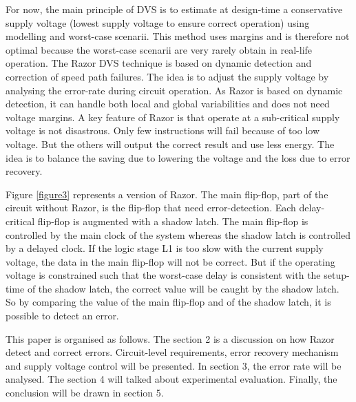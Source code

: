 \documentclass[fleqn,envcountsame,runningheads,10pt,a4paper]{llncs}
\begin{document}
For now, the main principle of DVS is to estimate at design-time a conservative supply voltage (lowest supply voltage to ensure correct operation) using modelling and worst-case scenarii. This method uses margins and is therefore not optimal because the worst-case scenarii are very rarely obtain in real-life operation. The Razor DVS technique is based on dynamic detection and correction of speed path failures. The idea is to adjust the supply voltage by analysing the error-rate during circuit operation. As Razor is based on dynamic detection, it can handle both local and global variabilities and does not need voltage margins. A key feature of Razor is that operate at a sub-critical supply voltage is not disastrous. Only few instructions will fail because of too low voltage. But the others will output the correct result and use less energy. The idea is to balance the saving due to lowering the voltage and the loss due to error recovery.

Figure \ref{figure3} represents a version of Razor. The main flip-flop, part of the circuit without Razor, is the flip-flop that need error-detection. Each delay-critical flip-flop is augmented with a shadow latch. The main flip-flop is controlled by the main clock of the system whereas the shadow latch is controlled by a delayed clock. If the logic stage L1 is too slow with the current supply voltage, the data in the main flip-flop will not be correct. But if the operating voltage is constrained such that the worst-case delay is consistent with the setup-time of the shadow latch, the correct value will be caught by the shadow latch. So by comparing the value of the main flip-flop and of the shadow latch, it is possible to detect an error. 

This paper is organised as follows. The section 2 is a discussion on how Razor detect and correct errors. Circuit-level requirements, error recovery mechanism and supply voltage control will be presented. In section 3, the error rate will be analysed. The section 4 will talked about experimental evaluation. Finally, the conclusion will be drawn in section 5. 
\end{document}
